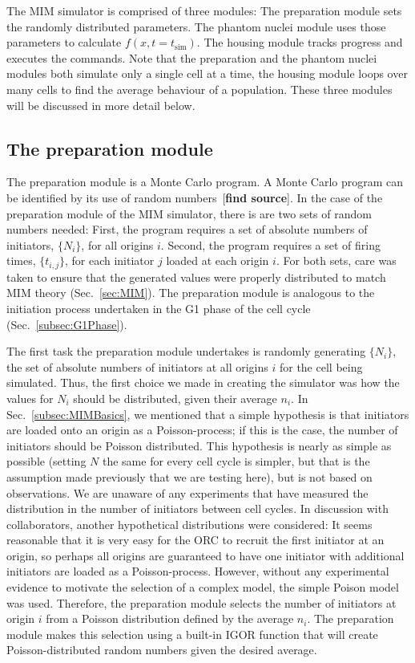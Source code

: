 	The MIM simulator is comprised of three modules:
	The preparation module sets the randomly distributed parameters.
	The phantom nuclei module uses those parameters to calculate $f(x,t=t_\text{sim})$.
	The housing module tracks progress and executes the commands.
	Note that the preparation and the phantom nuclei modules both simulate only a single cell at a time, the housing module loops over many cells to find the average behaviour of a population.
	These three modules will be discussed in more detail below.
	
	
		\subsection{The preparation module}
		\label{subsec:PrepModule}
		
		The preparation module is a Monte Carlo program.
		A Monte Carlo program can be identified by its use of random numbers~[\textbf{find source}].
		In the case of the preparation module of the MIM simulator, there is are two sets of random numbers needed:
		First, the program requires a set of absolute numbers of initiators, $\{N_i\}$, for all origins $i$.
		Second, the program requires a set of firing times, $\{t_{i,j}\}$, for each initiator $j$ loaded at each origin $i$.
		For both sets, care was taken to ensure that the generated values were properly distributed to match MIM theory (Sec.~\ref{sec:MIM}).
		The preparation module is analogous to the initiation process undertaken in the G1 phase of the cell cycle (Sec.~\ref{subsec:G1Phase}).
			
		The first task the preparation module undertakes is randomly generating $\{N_i\}$, the set of absolute numbers of initiators at all origins $i$ for the cell being simulated.
		Thus, the first choice we made in creating the simulator was how the values for $N_i$ should be distributed, given their average $n_i$.
		In Sec.~\ref{subsec:MIMBasics}, we mentioned that a simple hypothesis is that initiators are loaded onto an origin as a Poisson-process; if this is the case, the number of initiators should be Poisson distributed.
		This hypothesis is nearly as simple as possible (setting $N$ the same for every cell cycle is simpler, but that is the assumption made previously that we are testing here), but is not based on observations.
		We are unaware of any experiments that have measured the distribution in the number of initiators between cell cycles.	
		In discussion with collaborators, another hypothetical distributions were considered:
		It seems reasonable that it is very easy for the ORC to recruit the first initiator at an origin, so perhaps all origins are guaranteed to have one initiator with additional initiators are loaded as a Poisson-process.
		However, without any experimental evidence to motivate the selection of a complex model, the simple Poison model was used.
		Therefore, the preparation module selects the number of initiators at origin $i$ from a Poisson distribution defined by the average $n_i$.
		The preparation module makes this selection using a built-in IGOR function that will create Poisson-distributed random numbers given the desired average.
		
